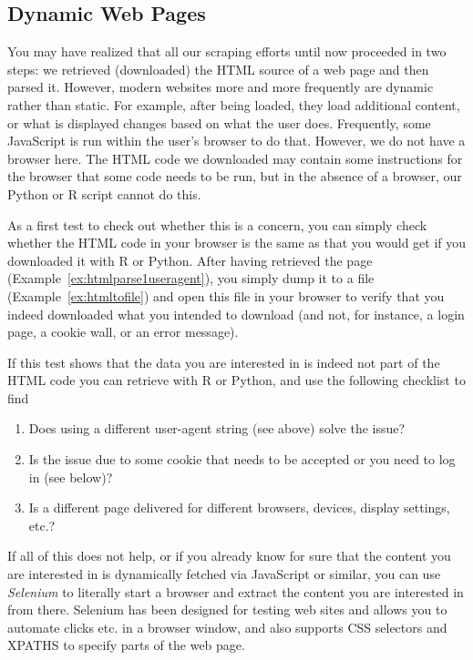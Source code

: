 \subsection{Dynamic Web Pages}
\label{sec:selenium}

You may have realized that all our scraping efforts until now
proceeded in two steps: we retrieved (downloaded) the HTML source of a
web page and then parsed it. However, modern websites more and more frequently 
are dynamic rather than static. For example, after being loaded, they
load additional content, or what is displayed changes based on what
the user does. Frequently, some JavaScript is run within the user's
browser to do that. However, we do not have a browser here. The HTML
code we downloaded may contain some instructions for the browser that
some code needs to be run, but in the absence of a browser, our Python
or R script cannot do this.

As a first test to check out whether this is a concern, you can simply
check whether the HTML code in your browser is the same as that you would
get if you downloaded it with R or Python.  After having retrieved the
page (Example~\ref{ex:htmlparse1useragent}), you simply dump it to a file
(Example~\ref{ex:htmltofile}) and open this file in your browser to verify that
you indeed downloaded what you intended to download (and not, for
instance, a login page, a cookie wall, or an error message).



If this test  shows that the data you are interested in is
indeed not part of the HTML code you can retrieve with R or Python,
and use the following checklist to find

\begin{enumerate}
\item Does using a different user-agent string (see above) solve the issue?
\item Is the issue due to some cookie that needs to be accepted or you need to log in (see below)?
\item Is a different page delivered for different browsers, devices, display settings, etc.?
\end{enumerate}

If all of this does not help, or if you already know for sure that the
content you are interested in is dynamically fetched via JavaScript or
similar, you can use \emph{Selenium} to literally start a browser and
extract the content you are interested in from there. Selenium has
been designed for testing web sites and allows you to automate clicks
etc. in a browser window, and also supports CSS selectors and XPATHS
to specify parts of the web page.

